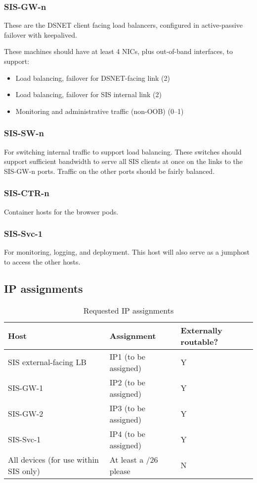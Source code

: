 \documentclass[10pt,a4paper]{article}
\begin{document}
\subsubsection{SIS-GW-n}

These are the DSNET client facing load balancers, configured in active-passive failover with keepalived.

These machines should have at least 4 NICs, plus out-of-band interfaces, to support:

\begin{itemize}
    \item Load balancing, failover for DSNET-facing link (2)
    \item Load balancing, failover for SIS internal link (2)
    \item Monitoring and administrative traffic (non-OOB) (0--1)
\end{itemize}

\subsubsection{SIS-SW-n}

For switching internal traffic to support load balancing.
These switches should support sufficient bandwidth to serve all SIS clients at once on the links to the SIS-GW-n ports.
Traffic on the other ports should be fairly balanced.

\subsubsection{SIS-CTR-n}

Container hosts for the browser pods.

\subsubsection{SIS-Svc-1}

For monitoring, logging, and deployment.
This host will also serve as a jumphost to access the other hosts.


\subsection{IP assignments}

\begin{table}[h!]
    \caption{Requested IP assignments}
    \begin{tabular}{l l l}
        Host & Assignment & Externally routable? \\
        \hline
        SIS external-facing LB & IP1 (to be assigned) & Y \\
        SIS-GW-1 & IP2 (to be assigned) & Y \\
        SIS-GW-2 & IP3 (to be assigned) & Y \\
        SIS-Svc-1 & IP4 (to be assigned) & Y \\
        All devices (for use within SIS only) & At least a /26 please & N \\
    \end{tabular}
\end{table}
\end{document}
